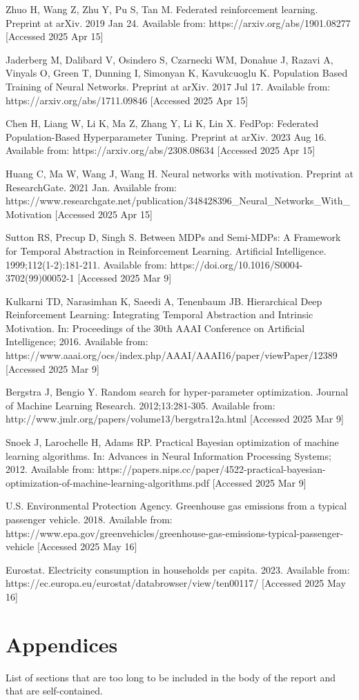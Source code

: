\documentclass[12pt,a4paper,twoside,openany]{book}
\begin{document}
\begin{thebibliography}{99}
Zhuo H, Wang Z, Zhu Y, Pu S, Tan M. Federated reinforcement learning. Preprint at arXiv. 2019 Jan 24. Available from: https://arxiv.org/abs/1901.08277 
[Accessed 2025 Apr 15]

Jaderberg M, Dalibard V, Osindero S, Czarnecki WM, Donahue J, Razavi A, Vinyals O, Green T, Dunning I, Simonyan K, Kavukcuoglu K. Population Based Training of Neural Networks. Preprint at arXiv. 2017 Jul 17. Available from: https://arxiv.org/abs/1711.09846 [Accessed 2025 Apr 15]

Chen H, Liang W, Li K, Ma Z, Zhang Y, Li K, Lin X. FedPop: Federated Population-Based Hyperparameter Tuning. Preprint at arXiv. 2023 Aug 16. Available from: https://arxiv.org/abs/2308.08634 [Accessed 2025 Apr 15]

Huang C, Ma W, Wang J, Wang H. Neural networks with motivation. Preprint at ResearchGate. 2021 Jan. Available from: https://www.researchgate.net/publication/348428396\_Neural\_Networks\_With\_Motivation [Accessed 2025 Apr 15]

Sutton RS, Precup D, Singh S. Between MDPs and Semi-MDPs: A Framework for Temporal Abstraction in Reinforcement Learning. Artificial Intelligence. 1999;112(1-2):181-211. Available from: https://doi.org/10.1016/S0004-3702(99)00052-1 [Accessed 2025 Mar 9]

Kulkarni TD, Narasimhan K, Saeedi A, Tenenbaum JB. Hierarchical Deep Reinforcement Learning: Integrating Temporal Abstraction and Intrinsic Motivation. In: Proceedings of the 30th AAAI Conference on Artificial Intelligence; 2016. Available from: https://www.aaai.org/ocs/index.php/AAAI/AAAI16/paper/viewPaper/12389 [Accessed 2025 Mar 9]

Bergstra J, Bengio Y. Random search for hyper-parameter optimization. Journal of Machine Learning Research. 2012;13:281-305. Available from: http://www.jmlr.org/papers/volume13/bergstra12a.html [Accessed 2025 Mar 9]

Snoek J, Larochelle H, Adams RP. Practical Bayesian optimization of machine learning algorithms. In: Advances in Neural Information Processing Systems; 2012. Available from: https://papers.nips.cc/paper/4522-practical-bayesian-optimization-of-machine-learning-algorithms.pdf [Accessed 2025 Mar 9]

U.S. Environmental Protection Agency. Greenhouse gas emissions from a typical passenger vehicle. 2018. Available from: https://www.epa.gov/greenvehicles/greenhouse-gas-emissions-typical-passenger-vehicle [Accessed 2025 May 16]

Eurostat. Electricity consumption in households per capita. 2023. Available from: https://ec.europa.eu/eurostat/databrowser/view/ten00117/ [Accessed 2025 May 16]



\end{thebibliography}

\chapter{Appendices}

List of sections that are too long to be included in the body of the report and that are self-contained.
\end{document}

